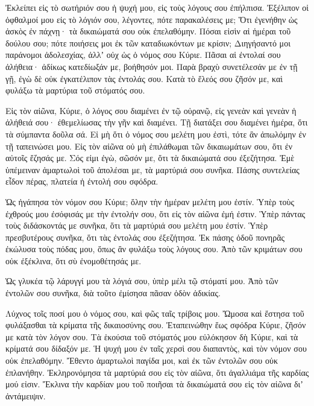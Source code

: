 \begin{spacing}{1.1}
\begin{multicols}{2}
Ἐκλείπει εἰς τὸ σωτήριόν σου ἡ ψυχή μου, εἰς τοὺς λόγους σου ἐπήλπισα.
Ἐξέλιπον οἱ ὀφθαλμοί μου εἰς τὸ λόγιόν σου, λέγοντες, πότε παρακαλέσεις με;
Ὅτι ἐγενήθην ὡς ἀσκὸς ἐν πάχνῃ· τὰ δικαιώματά σου οὐκ ἐπελαθόμην.
Πόσαι εἰσὶν αἱ ἡμέραι τοῦ δούλου σου; πότε ποιήσεις μοι ἐκ τῶν καταδιωκόντων με κρίσιν;
Διηγήσαντό μοι παράνομοι ἀδολεσχίας, ἀλλʼ οὐχ ὡς ὁ νόμος σου Κύριε.
Πᾶσαι αἱ ἐντολαί σου ἀλήθεια· ἀδίκως κατεδίωξάν με, βοήθησόν μοι.
Παρὰ βραχὺ συνετέλεσάν με ἐν τῇ γῇ, ἐγὼ δὲ οὐκ ἐγκατέλιπον τὰς ἐντολάς σου.
Κατὰ τὸ ἔλεός σου ζῆσόν με, καὶ φυλάξω τὰ μαρτύρια τοῦ στόματός σου.

Εἰς τὸν αἰῶνα, Κύριε, ὁ λόγος σου διαμένει ἐν τῷ οὐρανῷ,
εἰς γενεὰν καὶ γενεὰν ἡ ἀλήθειά σου· ἐθεμελίωσας τὴν γῆν καὶ διαμένει.
Τῇ διατάξει σου διαμένει ἡμέρα, ὅτι τὰ σύμπαντα δοῦλα σά.
Εἰ μὴ ὅτι ὁ νόμος σου μελέτη μου ἐστὶ, τότε ἂν ἀπωλόμην ἐν τῇ ταπεινώσει μου.
Εἰς τὸν αἰῶνα οὐ μὴ ἐπιλάθωμαι τῶν δικαιωμάτων σου, ὅτι ἐν αὐτοῖς ἔζησάς με.
Σός εἰμι ἐγὼ, σῶσόν με, ὅτι τὰ δικαιώματά σου ἐξεζήτησα.
Ἐμὲ ὑπέμειναν ἁμαρτωλοὶ τοῦ ἀπολέσαι με, τὰ μαρτύριά σου συνῆκα.
Πάσης συντελείας εἶδον πέρας, πλατεία ἡ ἐντολή σου σφόδρα.

Ὡς ἠγάπησα τὸν νόμον σου Κύριε; ὅλην τὴν ἡμέραν μελέτη μου ἐστίν.
Ὑπὲρ τοὺς ἐχθρούς μου ἐσόφισάς με τὴν ἐντολήν σου, ὅτι εἰς τὸν αἰῶνα ἐμή ἐστιν.
Ὑπὲρ πάντας τοὺς διδάσκοντάς με συνῆκα, ὅτι τὰ μαρτύριά σου μελέτη μου ἐστίν.
Ὑπὲρ πρεσβυτέρους συνῆκα, ὅτι τὰς ἐντολάς σου ἐξεζήτησα.
Ἐκ πάσης ὁδοῦ πονηρᾶς ἐκώλυσα τοὺς πόδας μου, ὅπως ἂν φυλάξω τοὺς λόγους σου.
Ἀπὸ τῶν κριμάτων σου οὐκ ἐξέκλινα, ὅτι σὺ ἐνομοθέτησάς με.

Ὡς γλυκέα τῷ λάρυγγί μου τὰ λόγιά σου, ὑπὲρ μέλι τῷ στόματί μου.
Ἀπὸ τῶν ἐντολῶν σου συνῆκα, διὰ τοῦτο ἐμίσησα πᾶσαν ὁδὸν ἀδικίας.

Λύχνος τοῖς ποσί μου ὁ νόμος σου, καὶ φῶς ταῖς τρίβοις μου.
Ὤμοσα καὶ ἔστησα τοῦ φυλάξασθαι τὰ κρίματα τῆς δικαιοσύνης σου.
Ἐταπεινώθην ἕως σφόδρα Κύριε, ζῆσόν με κατὰ τὸν λόγον σου.
Τὰ ἑκούσια τοῦ στόματός μου εὐλόκησον δὴ Κύριε, καὶ τὰ κρίματά σου δίδαξόν με.
Ἡ ψυχή μου ἐν ταῖς χερσὶ σου διαπαντὸς, καὶ τὸν νόμον σου οὐκ ἐπελαθόμην.
Ἔθεντο ἁμαρτωλοὶ παγίδα μοι, καὶ ἐκ τῶν ἐντολῶν σου οὐκ ἐπλανήθην.
Ἐκληρονόμησα τὰ μαρτύριά σου εἰς τὸν αἰῶνα, ὅτι ἀγαλλιάμα τῆς καρδίας μού εἰσιν.
Ἔκλινα τὴν καρδίαν μου τοῦ ποιῆσαι τὰ δικαιώματά σου εἰς τὸν αἰῶνα διʼ ἀντάμειψιν.


\end{multicols}
\end{spacing}
